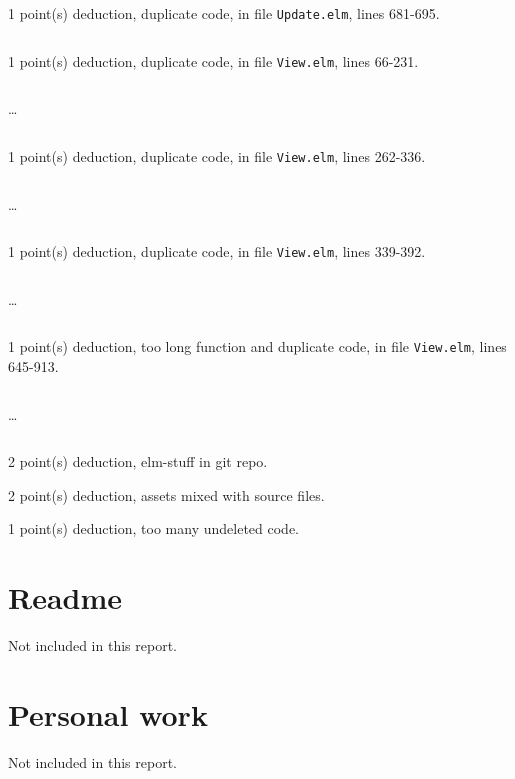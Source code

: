 \documentclass{article}
\begin{document}
1 point(s) {\color{red}deduction}, duplicate code, in file {\color{blue}\texttt{Update.elm}}, lines {\color{blue}681-695}.

\inputminted[firstline=681,lastline=695]{elm}{Update.elm}

1 point(s) {\color{red}deduction}, duplicate code, in file {\color{blue}\texttt{View.elm}}, lines {\color{blue}66-231}.

\inputminted[firstline=66,lastline=75]{elm}{View.elm}

\dots

\inputminted[firstline=222,lastline=231]{elm}{View.elm}

1 point(s) {\color{red}deduction}, duplicate code, in file {\color{blue}\texttt{View.elm}}, lines {\color{blue}262-336}.

\inputminted[firstline=262,lastline=271]{elm}{View.elm}

\dots

\inputminted[firstline=327,lastline=336]{elm}{View.elm}

1 point(s) {\color{red}deduction}, duplicate code, in file {\color{blue}\texttt{View.elm}}, lines {\color{blue}339-392}.

\inputminted[firstline=339,lastline=348]{elm}{View.elm}

\dots

\inputminted[firstline=383,lastline=392]{elm}{View.elm}

1 point(s) {\color{red}deduction}, too long function and duplicate code, in file {\color{blue}\texttt{View.elm}}, lines {\color{blue}645-913}.

\inputminted[firstline=645,lastline=654]{elm}{View.elm}

\dots

\inputminted[firstline=904,lastline=913]{elm}{View.elm}

2 point(s) {\color{red}deduction}, elm-stuff in git repo.\medskip

2 point(s) {\color{red}deduction}, assets mixed with source files.\medskip

1 point(s) {\color{red}deduction}, too many undeleted code.\medskip



\newpage

\section{Readme}

Not included in this report.

\section{Personal work}

Not included in this report.


\newpage
\end{document}
